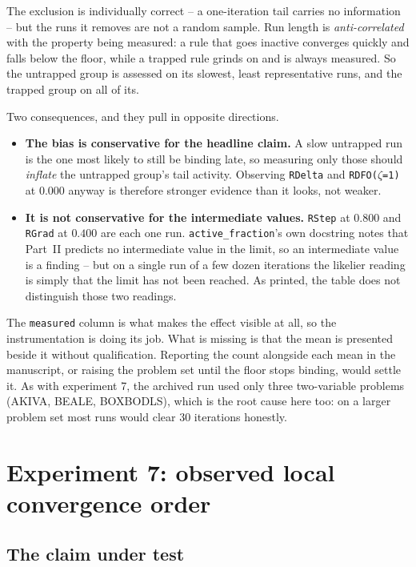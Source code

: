 \documentclass[11pt,a4paper]{article}
\newcommand{\jl}[1]{\texttt{\small #1}}
\begin{document}
The exclusion is individually correct -- a one-iteration tail carries no
information -- but the runs it removes are not a random sample. Run length is
\emph{anti-correlated} with the property being measured: a rule that goes inactive
converges quickly and falls below the floor, while a trapped rule grinds on and is
always measured. So the untrapped group is assessed on its slowest, least
representative runs, and the trapped group on all of its.

Two consequences, and they pull in opposite directions.

\begin{itemize}[leftmargin=6mm,itemsep=3pt]
  \item \textbf{The bias is conservative for the headline claim.} A slow untrapped
        run is the one most likely to still be binding late, so measuring only
        those should \emph{inflate} the untrapped group's tail activity. Observing
        \jl{RDelta} and \jl{RDFO($\zeta$=1)} at $0.000$ anyway is therefore stronger
        evidence than it looks, not weaker.
  \item \textbf{It is not conservative for the intermediate values.}
        \jl{RStep} at $0.800$ and \jl{RGrad} at $0.400$ are each one run.
        \jl{active\_fraction}'s own docstring notes that Part~II predicts no
        intermediate value in the limit, so an intermediate value is a finding --
        but on a single run of a few dozen iterations the likelier reading is
        simply that the limit has not been reached. As printed, the table does not
        distinguish those two readings.
\end{itemize}

The \jl{measured} column is what makes the effect visible at all, so the
instrumentation is doing its job. What is missing is that the mean is presented
beside it without qualification. Reporting the count alongside each mean in the
manuscript, or raising the problem set until the floor stops binding, would settle
it. As with experiment 7, the archived run used only three two-variable problems
(AKIVA, BEALE, BOXBODLS), which is the root cause here too: on a larger problem set
most runs would clear 30 iterations honestly.

\section{Experiment 7: observed local convergence order}

\subsection{The claim under test}
\end{document}
